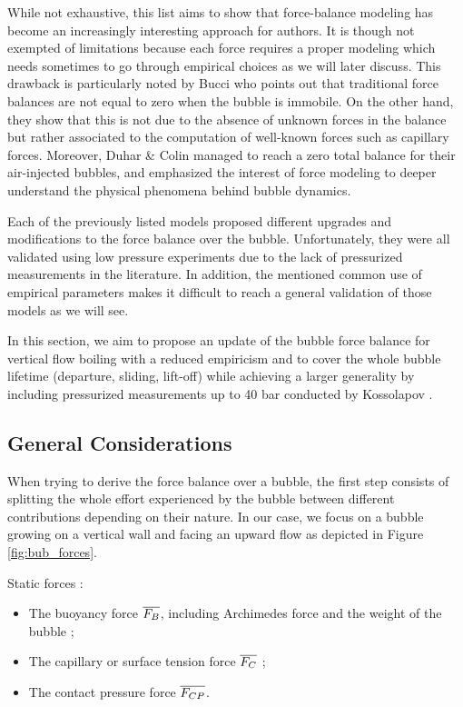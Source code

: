While not exhaustive, this list aims to show that force-balance modeling has become an increasingly interesting approach for authors. It is though not exempted of limitations because each force requires a proper modeling which needs sometimes to go through empirical choices as we will later discuss. This drawback is particularly noted by Bucci \etal \cite{bucci_not-so-subtle_2021} who points out that traditional force balances are not equal to zero when the bubble is immobile. On the other hand, they show that this is not due to the absence of unknown forces in the balance but rather associated to the computation of well-known forces such as capillary forces. Moreover, Duhar \& Colin \cite{duhar_dynamics_2006} managed to reach a zero total balance for their air-injected bubbles, and emphasized the interest of force modeling to deeper understand the physical phenomena behind bubble dynamics.

\npar
Each of the previously listed models proposed different upgrades and modifications to the force balance over the bubble. Unfortunately, they were all validated using low pressure experiments due to the lack of pressurized measurements in the literature. In addition, the mentioned common use of empirical parameters makes it difficult to reach a general validation of those models as we will see. 

\npar
In this section, we aim to propose an update of the bubble force balance for vertical  flow boiling with a reduced empiricism and to cover the whole bubble lifetime (departure, sliding, lift-off) while achieving a larger generality by including pressurized measurements up to 40 bar conducted by Kossolapov \cite{kossolapov_experimental_2021}.

\subsection{General Considerations}


When trying to derive the force balance over a bubble, the first step consists of splitting the whole effort experienced by the bubble between different contributions depending on their nature. In our case, we focus on a bubble growing on a vertical wall and facing an upward flow as depicted in Figure \ref{fig:bub_forces}. 

\npar

Static forces : 

\begin{itemize}
\item The buoyancy force $\overline{F_{B}}$, including Archimedes force and the weight of the bubble ;
\item The capillary or surface tension force $\overline{F_{C}}$ ;
\item The contact pressure force $\overline{F_{CP}}$.
\end{itemize}


